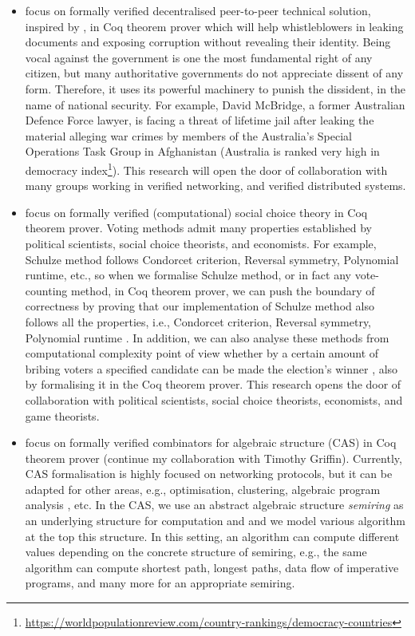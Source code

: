 \documentclass[a4paper]{article}
\begin{document}
\begin{itemize}
\item focus on formally verified decentralised peer-to-peer technical solution, inspired by 
\cite{liu2004linkable, Clarke2001, schimmer2009peer}, in Coq theorem prover which will help 
whistleblowers in leaking documents and exposing corruption without revealing their identity. 
Being vocal against the government is one the most fundamental right of any citizen, but many 
authoritative governments do not appreciate dissent of any form. Therefore, it uses 
its powerful machinery to punish the dissident, in the name of national security. 
For example, David McBridge, a former Australian Defence Force lawyer,  
is facing a threat of lifetime jail after
leaking the material alleging war crimes by members of the Australia's Special Operations
Task Group in Afghanistan (Australia is ranked very high in 
democracy index\footnote{\url{https://worldpopulationreview.com/country-rankings/democracy-countries}}). 
This research will open the door of collaboration with many groups working in verified 
networking, and verified distributed systems. 



\item focus on formally verified (computational) social choice theory in Coq theorem prover. 
	Voting methods admit many properties established by political scientists, social choice theorists, 
	and economists. For example, Schulze method follows Condorcet criterion, Reversal symmetry,
	Polynomial runtime, etc., so when we formalise Schulze method, or in fact any vote-counting method,
	in Coq theorem prover, we can push the boundary of correctness by proving that our 
	implementation of Schulze method also follows all the properties, i.e.,  Condorcet criterion, Reversal symmetry,
	Polynomial runtime  \cite{tiwari2021machine}. 
	In addition, we can also analyse these 
	methods from computational complexity point of view whether by a certain amount of bribing
	voters a specified candidate can be made the election's winner \cite{faliszewski2006complexity},
	also by formalising it in the Coq theorem prover. 
	This research opens the door of collaboration with political scientists, 
	social choice theorists, economists, and game theorists.

	

\item focus on formally verified combinators for algebraic structure (CAS) in Coq theorem prover 
	(continue my collaboration with Timothy Griffin). 
	Currently, CAS formalisation is highly focused on networking protocols, but it can be 
	adapted for other areas, e.g., optimisation, clustering, algebraic program 
	analysis , etc. In the CAS, we use an abstract algebraic structure 
	\emph{semiring} as an underlying structure
	for computation and and we model various algorithm at the top this 
	structure. In this setting, an algorithm can compute different values depending 
	on the concrete structure of semiring, e.g., the same algorithm 
	can compute shortest path, longest paths, 
	data flow of imperative programs, and many more \cite{gondran2008graphs} 
	for an appropriate semiring.
	

\end{itemize}
\end{document}
